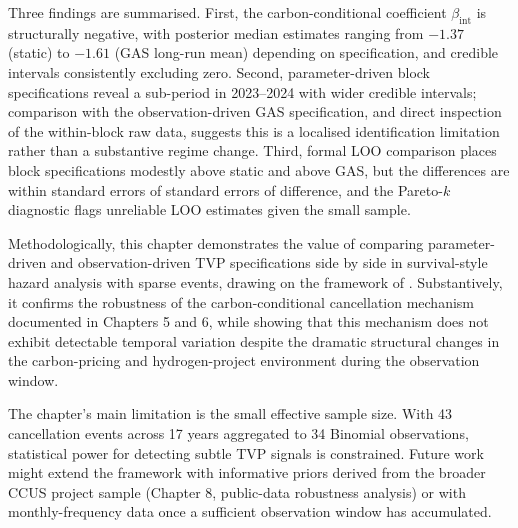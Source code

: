 \documentclass[11pt,a4paper]{article}
\newcommand{\bint}{\beta_{\mathrm{int}}}
\begin{document}
Three findings are summarised. First, the carbon-conditional coefficient $\bint$ is structurally negative, with posterior median estimates ranging from $-1.37$ (static) to $-1.61$ (GAS long-run mean) depending on specification, and credible intervals consistently excluding zero. Second, parameter-driven block specifications reveal a sub-period in 2023--2024 with wider credible intervals; comparison with the observation-driven GAS specification, and direct inspection of the within-block raw data, suggests this is a localised identification limitation rather than a substantive regime change. Third, formal LOO comparison places block specifications modestly above static and above GAS, but the differences are within standard errors of standard errors of difference, and the Pareto-$k$ diagnostic flags unreliable LOO estimates given the small sample.

Methodologically, this chapter demonstrates the value of comparing parameter-driven and observation-driven TVP specifications side by side in survival-style hazard analysis with sparse events, drawing on the framework of \citet{koopman2016predicting}. Substantively, it confirms the robustness of the carbon-conditional cancellation mechanism documented in Chapters 5 and 6, while showing that this mechanism does not exhibit detectable temporal variation despite the dramatic structural changes in the carbon-pricing and hydrogen-project environment during the observation window.

The chapter's main limitation is the small effective sample size. With 43 cancellation events across 17 years aggregated to 34 Binomial observations, statistical power for detecting subtle TVP signals is constrained. Future work might extend the framework with informative priors derived from the broader CCUS project sample (Chapter 8, public-data robustness analysis) or with monthly-frequency data once a sufficient observation window has accumulated.
\end{document}
